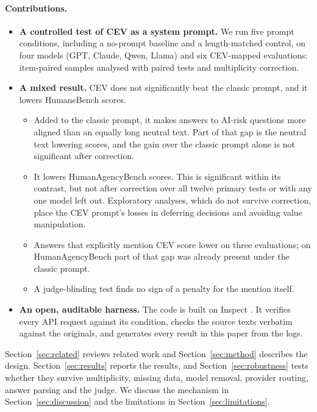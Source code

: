 \paragraph{Contributions.}
\begin{itemize}
  \item \textbf{A controlled test of CEV as a system prompt.} We run five prompt conditions, including a no-prompt
  baseline and a length-matched control, on four models (GPT, Claude, Qwen, Llama) and six CEV-mapped evaluations:
  \RNSamples{} item-paired samples analysed with paired tests and multiplicity correction.
  \item \textbf{A mixed result.} CEV does not significantly beat the classic prompt, and it lowers HumaneBench scores.
  \begin{itemize}
    \item Added to the classic prompt, it makes answers to AI-risk questions more aligned than an equally long
    neutral text. Part of that gap is the neutral text lowering scores, and the gain over the classic prompt alone is
    not significant after correction.
    \item It lowers HumanAgencyBench scores. This is significant within its contrast, but not after correction over
    all twelve primary tests or with any one model left out. Exploratory analyses, which do not survive correction,
    place the CEV prompt's losses in deferring decisions and avoiding value manipulation.
    \item Answers that explicitly mention CEV score lower on three evaluations; on HumanAgencyBench part of that gap
    was already present under the classic prompt.
    \item A judge-blinding test finds no sign of a penalty for the mention itself.
  \end{itemize}
  \item \textbf{An open, auditable harness.} The code is built on Inspect \citep{inspect2024,inspectevals2024}. It
  verifies every API request against its condition, checks the source texts verbatim against the originals, and
  generates every result in this paper from the logs.
\end{itemize}

Section~\ref{sec:related} reviews related work and Section~\ref{sec:method} describes the design.
Section~\ref{sec:results} reports the results, and Section~\ref{sec:robustness} tests whether they survive
multiplicity, missing data, model removal, provider routing, answer parsing and the judge. We discuss the mechanism in
Section~\ref{sec:discussion} and the limitations in Section~\ref{sec:limitations}.
